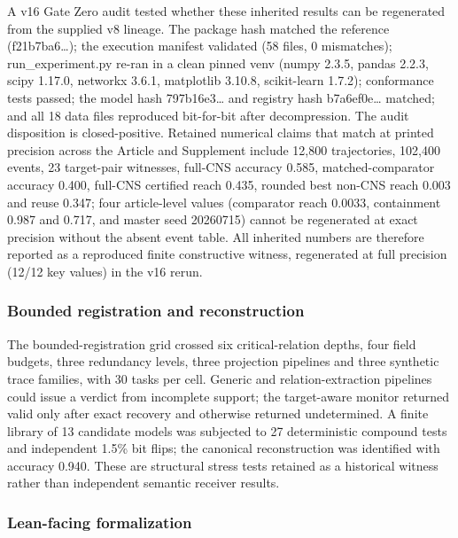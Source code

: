 A v16 Gate Zero audit tested whether these inherited results can be
regenerated from the supplied v8 lineage. The package hash matched the
reference (f21b7ba6\ldots); the execution manifest validated (58 files,
0 mismatches); run\_experiment.py re-ran in a clean pinned venv (numpy
2.3.5, pandas 2.2.3, scipy 1.17.0, networkx 3.6.1, matplotlib 3.10.8,
scikit-learn 1.7.2); conformance tests passed; the model hash
797b16e3\ldots{} and registry hash b7a6ef0e\ldots{} matched; and all 18
data files reproduced bit-for-bit after decompression. The audit
disposition is closed-positive. Retained numerical claims that match at
printed precision across the Article and Supplement include 12,800
trajectories, 102,400 events, 23 target-pair witnesses, full-CNS
accuracy 0.585, matched-comparator accuracy 0.400, full-CNS certified
reach 0.435, rounded best non-CNS reach 0.003 and reuse 0.347; four
article-level values (comparator reach 0.0033, containment 0.987 and
0.717, and master seed 20260715) cannot be regenerated at exact
precision without the absent event table. All inherited numbers are
therefore reported as a reproduced finite constructive witness,
regenerated at full precision (12/12 key values) in the v16 rerun.

\hypertarget{bounded-registration-and-reconstruction}{%
\subsubsection{Bounded registration and
reconstruction}\label{bounded-registration-and-reconstruction}}

The bounded-registration grid crossed six critical-relation depths, four
field budgets, three redundancy levels, three projection pipelines and
three synthetic trace families, with 30 tasks per cell. Generic and
relation-extraction pipelines could issue a verdict from incomplete
support; the target-aware monitor returned valid only after exact
recovery and otherwise returned undetermined. A finite library of 13
candidate models was subjected to 27 deterministic compound tests and
independent 1.5\% bit flips; the canonical reconstruction was identified
with accuracy 0.940. These are structural stress tests retained as a
historical witness rather than independent semantic receiver results.

\hypertarget{lean-facing-formalization}{%
\subsubsection{Lean-facing
formalization}\label{lean-facing-formalization}}


